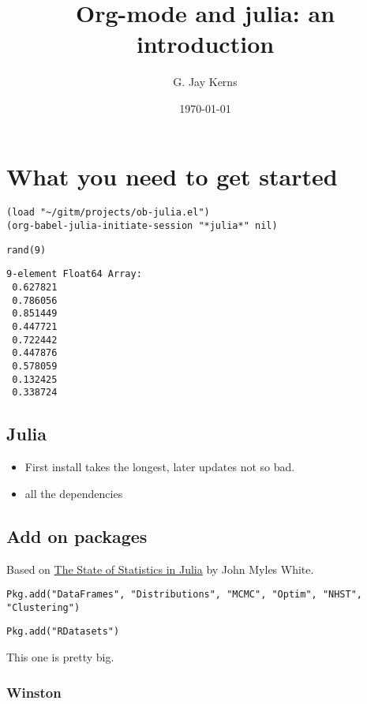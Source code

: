 \documentclass[11pt]{article}
\author{G. Jay Kerns}
\date{\today}
\title{Org-mode and julia: an introduction}
\begin{document}
\maketitle
\tableofcontents


\section[What you need to get started]{What you need to get started}
\label{sec-1}

\begin{verbatim}
(load "~/gitm/projects/ob-julia.el")
(org-babel-julia-initiate-session "*julia*" nil)
\end{verbatim}

\begin{verbatim}
rand(9)
\end{verbatim}

\begin{verbatim}
9-element Float64 Array:
 0.627821
 0.786056
 0.851449
 0.447721
 0.722442
 0.447876
 0.578059
 0.132425
 0.338724
\end{verbatim}

\subsection[Julia]{Julia}
\label{sec-1-1}
\begin{itemize}
\item First install takes the longest, later updates not so bad.
\item all the dependencies
\end{itemize}
\subsection[Add on packages]{Add on packages}
\label{sec-1-2}

Based on \href{http://www.johnmyleswhite.com/notebook/2012/12/02/the-state-of-statistics-in-julia/}{The State of Statistics in Julia} by John Myles White.

\begin{verbatim}
Pkg.add("DataFrames", "Distributions", "MCMC", "Optim", "NHST", "Clustering")
\end{verbatim}

\begin{verbatim}
Pkg.add("RDatasets")
\end{verbatim}

This one is pretty big.

\subsubsection[Winston]{Winston}
\label{sec-1-2-1}
\end{document}
